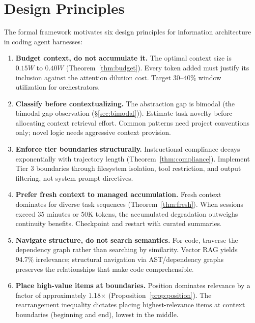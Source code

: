 \documentclass[11pt, a4paper, logo, copyright]{googledeepmind}
\begin{document}
\section{Design Principles}
\label{sec:design}

The formal framework motivates six design principles for information architecture in coding agent harnesses:

\begin{enumerate}
    \item \textbf{Budget context, do not accumulate it.} The optimal context size is $0.15W$ to $0.40W$ (Theorem~\ref{thm:budget}). Every token added must justify its inclusion against the attention dilution cost. Target 30--40\% window utilization for orchestrators.

    \item \textbf{Classify before contextualizing.} The abstraction gap is bimodal (the bimodal gap observation (\S\ref{sec:bimodal})). Estimate task novelty before allocating context retrieval effort. Common patterns need project conventions only; novel logic needs aggressive context provision.

    \item \textbf{Enforce tier boundaries structurally.} Instructional compliance decays exponentially with trajectory length (Theorem~\ref{thm:compliance}). Implement Tier 3 boundaries through filesystem isolation, tool restriction, and output filtering, not system prompt directives.

    \item \textbf{Prefer fresh context to managed accumulation.} Fresh context dominates for diverse task sequences (Theorem~\ref{thm:fresh}). When sessions exceed 35 minutes or 50K tokens, the accumulated degradation outweighs continuity benefits. Checkpoint and restart with curated summaries.

    \item \textbf{Navigate structure, do not search semantics.} For code, traverse the dependency graph rather than searching by similarity. Vector RAG yields 94.7\% irrelevance; structural navigation via AST/dependency graphs preserves the relationships that make code comprehensible.

    \item \textbf{Place high-value items at boundaries.} Position dominates relevance by a factor of approximately 1.18$\times$ (Proposition~\ref{prop:position}). The rearrangement inequality dictates placing highest-relevance items at context boundaries (beginning and end), lowest in the middle.
\end{enumerate}
\end{document}
